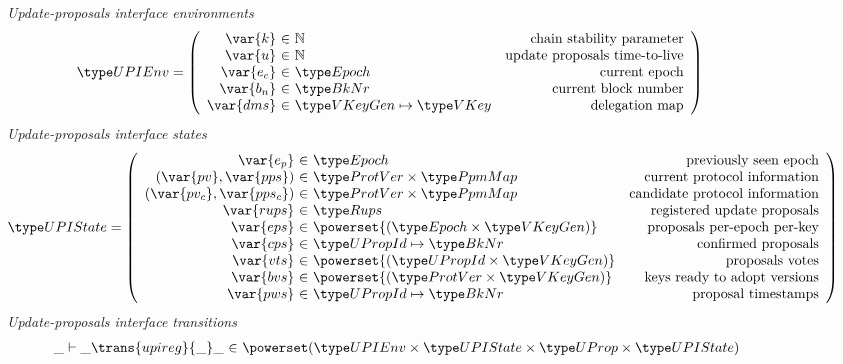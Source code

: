 \begin{figure}[htb]
  \emph{Update-proposals interface environments}
  \begin{align*}
    & \UPIEnv
      = \left(
      \begin{array}{r@{~\in~}lr}
        \var{k} & \mathbb{N} & \text{chain stability parameter}\\
        \var{u} & \mathbb{N} & \text{update proposals time-to-live}\\
        \var{e_c} & \Epoch & \text{current epoch}\\
        \var{b_n} & \BkNr & \text{current block number}\\
        \var{dms} & \VKeyGen \mapsto \VKey & \text{delegation map}\\
      \end{array}\right)
  \end{align*}
  \emph{Update-proposals interface states}
  \begin{align*}
    & \UPIState
      = \left(
      \begin{array}{r@{~\in~}lr}
        \var{e_p} & \Epoch & \text{previously seen epoch}\\
        (\var{pv}, \var{pps}) & \ProtVer \times \PPMMap
        & \text{current protocol information}\\
        (\var{pv_c}, \var{pps_c}) & \ProtVer \times \PPMMap
        & \text{candidate protocol information}\\
        \var{rups} & \Rups
        & \text{registered update proposals}\\
        \var{eps} & \powerset{(\Epoch \times \VKeyGen)}
        & \text{proposals per-epoch per-key}\\
        \var{cps} & \UPropId \mapsto \BkNr & \text{confirmed proposals}\\
        \var{vts} & \powerset{(\UPropId \times \VKeyGen)} & \text{proposals votes}\\
        \var{bvs} & \powerset{(\ProtVer \times \VKeyGen)}
                           & \text{keys ready to adopt versions}\\
        \var{pws} & \UPropId \mapsto \BkNr & \text{proposal timestamps}
      \end{array}\right)
  \end{align*}
  \emph{Update-proposals interface transitions}
  \begin{equation*}
    \begin{array}{r@{~\in~}l}
      \_ \vdash \_ \trans{upireg}{\_} \_ &
      \powerset (\UPIEnv \times \UPIState \times \UProp \times \UPIState)\\

\end{array}
\end{equation*}
\end{figure}
